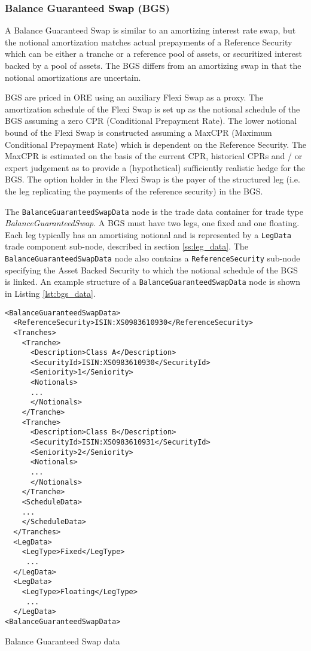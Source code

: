 \subsubsection{Balance Guaranteed Swap (BGS)}

A Balance Guaranteed Swap is similar to an amortizing interest rate swap, but the  
notional amortization matches actual prepayments of a Reference Security which can 
be either a tranche or a reference pool of assets, or securitized interest backed 
by a pool of assets. The BGS differs from an amortizing swap in that the notional 
amortizations are uncertain.

BGS are priced in ORE using an auxiliary Flexi Swap as a proxy. The amortization schedule 
of the Flexi Swap is set up as the notional schedule of the BGS assuming a zero 
CPR (Conditional Prepayment Rate). The lower notional bound of the Flexi Swap is 
constructed assuming a MaxCPR (Maximum Conditional Prepayment Rate) which is 
dependent on the Reference Security. The MaxCPR is estimated on the basis of 
the current CPR, historical CPRs and / or expert judgement as to provide a 
(hypothetical) sufficiently realistic hedge for the BGS. The option holder in 
the Flexi Swap is the payer of the structured leg (i.e. the leg replicating the 
payments of the reference security) in the BGS.

The \lstinline!BalanceGuaranteedSwapData! node is the trade data container for trade type \emph{BalanceGuaranteedSwap}.  A BGS must have two legs, one fixed and one floating. Each leg typically has an amortising notional and is represented by a \lstinline!LegData! trade component sub-node, described in section \ref{ss:leg_data}.
The \lstinline!BalanceGuaranteedSwapData! node also contains a \lstinline!ReferenceSecurity! sub-node specifying the Asset Backed Security to which the notional schedule of the BGS is linked. 
An example structure of a  \lstinline!BalanceGuaranteedSwapData! node is shown in Listing \ref{lst:bgs_data}.
\begin{listing}[H]
\begin{verbatim}
<BalanceGuaranteedSwapData>
  <ReferenceSecurity>ISIN:XS0983610930</ReferenceSecurity>
  <Tranches>
    <Tranche>
      <Description>Class A</Description>
      <SecurityId>ISIN:XS0983610930</SecurityId>
      <Seniority>1</Seniority>
      <Notionals>
      ...
      </Notionals>
    </Tranche>
    <Tranche>
      <Description>Class B</Description>
      <SecurityId>ISIN:XS0983610931</SecurityId>
      <Seniority>2</Seniority>
      <Notionals>
      ...
      </Notionals>
    </Tranche>
    <ScheduleData>
    ...
    </ScheduleData>
  </Tranches>
  <LegData>
	<LegType>Fixed</LegType>
	 ...
  </LegData>
  <LegData>
	<LegType>Floating</LegType>
	 ...
  </LegData>
<BalanceGuaranteedSwapData>
\end{verbatim}
\caption{Balance Guaranteed Swap data}
\label{lst:bgs_data}
\end{listing}

